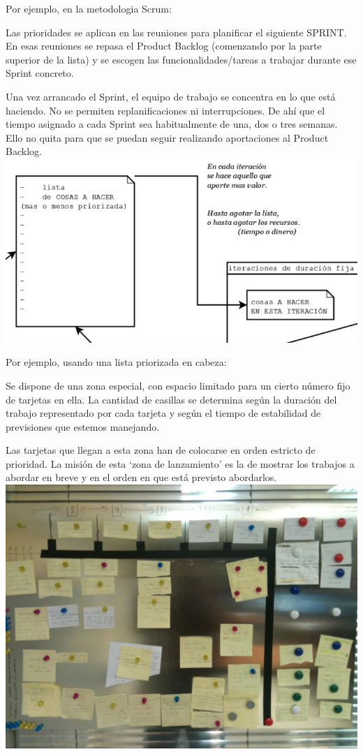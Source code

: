 \documentclass[spanish,12pt,a4paper,final,oneside]{book}
\begin{document}
Por ejemplo, en la metodologia Scrum:

Las prioridades se aplican en las reuniones para planificar el siguiente SPRINT. En esas reuniones se repasa el Product Backlog (comenzando por la parte superior de la lista) y se escogen las funcionalidades/tareas a trabajar durante ese Sprint concreto.

Una vez arrancado el Sprint, el equipo de trabajo se concentra en lo que está haciendo. No se permiten replanificaciones ni interrupciones. De ahí que el tiempo asignado a cada Sprint sea habitualmente de una, dos o tres semanas.
Ello no quita para que se puedan seguir realizando aportaciones al Product Backlog.
\\
\includegraphics[width=\textwidth]{product backlog vs. sprint backlog} 

Por ejemplo, usando una lista priorizada en cabeza:

Se dispone de una zona especial, con espacio limitado para un cierto número fijo de tarjetas en ella. La cantidad de casillas se determina según la duración del trabajo representado por cada tarjeta y según el tiempo de estabilidad de previsiones que estemos manejando. 

Las tarjetas que llegan a esta zona han de colocarse en orden estricto de prioridad. La misión de esta `zona de lanzamiento' es la de mostrar los trabajos a abordar en breve y en el orden en que está previsto abordarlos. 
\\
\includegraphics[width=\textwidth]{tablon con una lista priorizada en cabeza}
\end{document}
